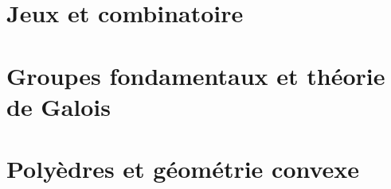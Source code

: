 \documentclass[11pt]{article}
\theoremstyle{plain}
\theoremstyle{definition}
\theoremstyle{plain}
\theoremstyle{definition}
\theoremstyle{remark}
\renewcommand{\_}{\bkunderscore\allowbreak}
\begin{document}
\part{Jeux et combinatoire}


\part{Groupes fondamentaux et théorie de Galois}




\part{Polyèdres et géométrie convexe}



\end{document}
